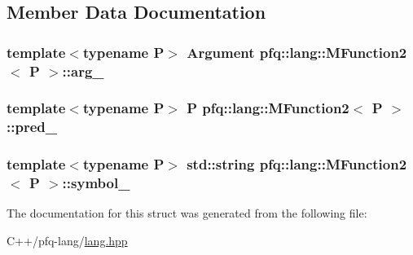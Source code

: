 \subsection{Member Data Documentation}
\hypertarget{structpfq_1_1lang_1_1MFunction2_a4f7c22f4fe50fe26f130d736303d75fa}{
\subsubsection[{arg\+\_\+}]{\setlength{\rightskip}{0pt plus 5cm}template$<$typename P$>$ {\bf Argument} {\bf pfq\+::lang\+::\+M\+Function2}$<$ P $>$\+::arg\+\_\+}}\label{structpfq_1_1lang_1_1MFunction2_a4f7c22f4fe50fe26f130d736303d75fa}
\hypertarget{structpfq_1_1lang_1_1MFunction2_a55acfd3493eb2369c4591e3ecb4a8d33}{
\subsubsection[{pred\+\_\+}]{\setlength{\rightskip}{0pt plus 5cm}template$<$typename P$>$ P {\bf pfq\+::lang\+::\+M\+Function2}$<$ P $>$\+::pred\+\_\+}}\label{structpfq_1_1lang_1_1MFunction2_a55acfd3493eb2369c4591e3ecb4a8d33}
\hypertarget{structpfq_1_1lang_1_1MFunction2_a74137a8065d53ce354c03718b5724d50}{
\subsubsection[{symbol\+\_\+}]{\setlength{\rightskip}{0pt plus 5cm}template$<$typename P$>$ std\+::string {\bf pfq\+::lang\+::\+M\+Function2}$<$ P $>$\+::symbol\+\_\+}}\label{structpfq_1_1lang_1_1MFunction2_a74137a8065d53ce354c03718b5724d50}


The documentation for this struct was generated from the following file\+:\begin{DoxyCompactItemize}
\item 
C++/pfq-\/lang/\hyperlink{lang_8hpp}{lang.\+hpp}\end{DoxyCompactItemize}
